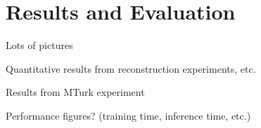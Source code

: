 \section{Results and Evaluation}
\label{sec:resultsAndEval}

Lots of pictures

Quantitative results from reconstruction experiments, etc.

Results from MTurk experiment

Performance figures? (training time, inference time, etc.)